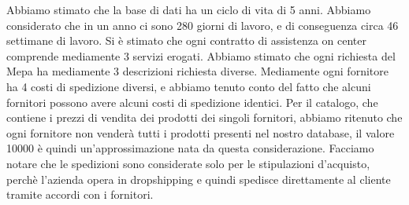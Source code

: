 \noindent{}

\noindent
Abbiamo stimato che la base di dati ha un ciclo di vita di 5 anni.
\newline
Abbiamo considerato che in un anno ci sono 280 giorni di lavoro, e di conseguenza circa 46 settimane di lavoro.
\newline
Si è stimato che ogni contratto di assistenza on center comprende mediamente 3 servizi erogati.
\newline
Abbiamo stimato che ogni richiesta del Mepa ha mediamente 3 descrizioni richiesta diverse.
\newline
Mediamente ogni fornitore ha 4 costi di spedizione diversi, e abbiamo tenuto conto del fatto che alcuni fornitori possono avere alcuni costi di spedizione identici.
\newline
Per il catalogo, che contiene i prezzi di vendita dei prodotti dei singoli fornitori, abbiamo ritenuto che ogni fornitore non venderà tutti i prodotti presenti nel nostro database, il valore 10000 è quindi un'approssimazione nata da questa considerazione.
\newline
Facciamo notare che le spedizioni sono considerate solo per le stipulazioni d'acquisto, perchè l'azienda opera in dropshipping e quindi spedisce direttamente al cliente tramite accordi con i fornitori.

